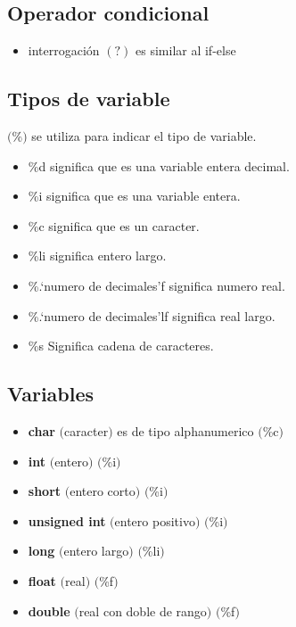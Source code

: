 \documentclass[]{article}
\begin{document}
	\subsection{Operador condicional}
	\begin{itemize}
		\item interrogación $\left(?\right)$ es similar al if-else
	\end{itemize}
	
	
	\subsection{Tipos de variable}
	$($\%$)$ se utiliza para indicar el tipo de variable.
	
	\begin{itemize}
		\item \%d significa que es una variable entera decimal.
		\item \%i significa que es una variable entera.
		\item \%c significa que es un caracter.
		\item \%li significa entero largo.
		\item \%.`numero de decimales'f significa numero real.
		\item \%.`numero de decimales'lf significa real largo.
		\item \%s Significa cadena de caracteres.
	\end{itemize}
	
	\subsection{Variables}
	
	\begin{itemize}
		\item \textbf{char} $($caracter$)$ es de tipo alphanumerico $($\%c$)$
		\item \textbf{int} $($entero$)$ $($\%i$)$
		\item \textbf{short} $($entero corto$)$ $($\%i$)$
		\item \textbf{unsigned int} $($entero positivo$)$ $($\%i$)$
		\item \textbf{long} $($entero largo$)$ $($\%li$)$
		\item \textbf{float} $($real$)$ $($\%f$)$
		\item \textbf{double} $($real con doble de rango$)$ $($\%f$)$
		
	\end{itemize}
	
\end{document}
